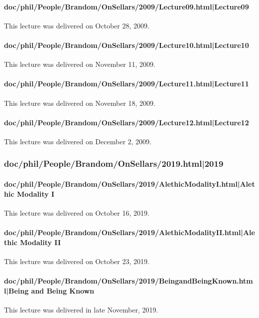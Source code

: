 \documentclass[12pt,a4paper]{report}
\begin{document}
\paragraph{doc/phil/People/Brandom/OnSellars/2009/Lecture09.html|Lecture09}
This lecture was delivered on October 28, 2009.

\paragraph{doc/phil/People/Brandom/OnSellars/2009/Lecture10.html|Lecture10}
This lecture was delivered on November 11, 2009.

\paragraph{doc/phil/People/Brandom/OnSellars/2009/Lecture11.html|Lecture11}
This lecture was delivered on November 18, 2009.

\paragraph{doc/phil/People/Brandom/OnSellars/2009/Lecture12.html|Lecture12}
This lecture was delivered on December 2, 2009.

\subsubsection{doc/phil/People/Brandom/OnSellars/2019.html|2019}

\paragraph{doc/phil/People/Brandom/OnSellars/2019/AlethicModalityI.html|Alethic Modality I}
This lecture was delivered on October 16, 2019.

\paragraph{doc/phil/People/Brandom/OnSellars/2019/AlethicModalityII.html|Alethic Modality II}
This lecture was delivered on October 23, 2019.

\paragraph{doc/phil/People/Brandom/OnSellars/2019/BeingandBeingKnown.html|Being and Being Known}
This lecture was delivered in late November, 2019.
\end{document}
